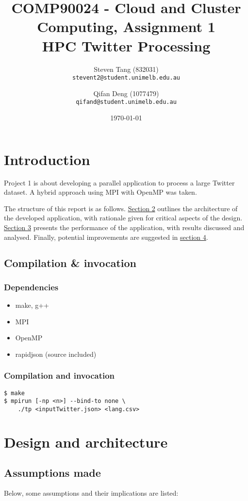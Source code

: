 \documentclass[10pt]{article}
\title{COMP90024 - Cloud and Cluster Computing, Assignment 1\\HPC Twitter Processing }
\author{
  Steven Tang (832031)\\
  \texttt{stevent2@student.unimelb.edu.au}\and
  Qifan Deng (1077479)\\
  \texttt{qifand@student.unimelb.edu.au} }
\date{\printdayoff\normalsize\today}
\begin{document}
\sloppy
\twocolumn
\maketitle

\section{Introduction}
Project 1 is about developing a parallel application to process a large Twitter dataset. A hybrid approach using MPI with OpenMP was taken. 

The structure of this report is as follows. \hyperref[design]{Section 2} outlines the architecture of the developed application, with rationale given for critical aspects of the design. \hyperref[results]{Section 3} presents the performance of the application, with results discussed and analysed. Finally, potential improvements are suggested in \hyperref[improvements]{section 4}. 

\subsection{Compilation \& invocation}
\subsubsection{Dependencies}
\begin{itemize}
  \setlength\itemsep{1pt}
    \item make, g++
    \item MPI
    \item OpenMP
    \item rapidjson (source included)
\end{itemize}

\subsubsection{Compilation and invocation}
\begin{verbatim}
$ make
$ mpirun [-np <n>] --bind-to none \
    ./tp <inputTwitter.json> <lang.csv>
\end{verbatim}

\section{Design and architecture}
\label{design}
\subsection{Assumptions made}
Below, some assumptions and their implications are listed:
\end{document}
